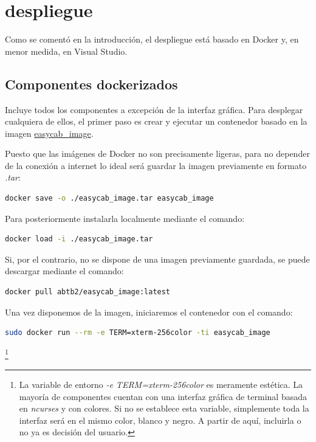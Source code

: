 \documentclass[a4paper,12pt]{article}
\begin{document}
\begin{figure}[h]
  \centering
\end{figure}
\clearpage




\clearpage
\section{despliegue}
Como se comentó en la introducción, el despliegue está basado en Docker y, en menor medida, en Visual Studio.
\subsection{Componentes dockerizados}
\label{sec:componentes_docker}
Incluye todos los componentes a excepción de la interfaz gráfica.
Para desplegar cualquiera de ellos, el primer paso es crear y ejecutar un contenedor basado en la imagen
\href{https://hub.docker.com/repository/docker/abtb2/easycab_image/general}{easycab\_image}. \par

Puesto que las imágenes de Docker no son precisamente ligeras, para no depender de la conexión a internet lo ideal
será guardar la imagen previamente en formato \textit{.tar}:
\begin{lstlisting}[language=bash]
  docker save -o ./easycab_image.tar easycab_image
\end{lstlisting}

Para posteriormente instalarla localmente mediante el comando:

\begin{lstlisting}[language=bash]
  docker load -i ./easycab_image.tar
\end{lstlisting}

Si, por el contrario, no se dispone de una imagen previamente guardada, se puede descargar mediante el comando:

\begin{lstlisting}[language=bash]
  docker pull abtb2/easycab_image:latest
\end{lstlisting}
Una vez disponemos de la imagen, iniciaremos el contenedor con el comando:
\begin{lstlisting}[language=bash]
  sudo docker run --rm -e TERM=xterm-256color -ti easycab_image   
\end{lstlisting}
\footnote{
  La variable de entorno \textit{-e TERM=xterm-256color} es meramente estética. La mayoría de componentes cuentan
  con una interfaz gráfica de terminal basada en \textit{ncurses} y con colores. Si no se establece esta variable, simplemente
  toda la interfaz será en el mismo color, blanco y negro. A partir de aquí, incluirla o no ya es decisión del usuario.}
\end{document}
